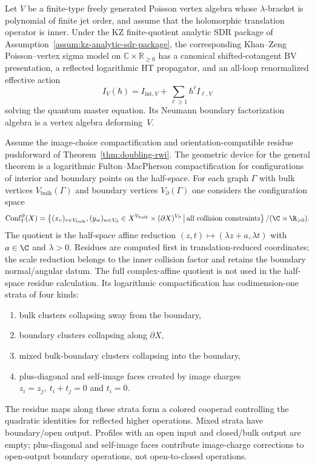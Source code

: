 \begin{theorem}\label{thm:general-half-space-bv-preview}
Let $V$ be a finite-type freely generated Poisson vertex algebra
whose $\lambda$-bracket is polynomial of finite jet order, and assume
that the holomorphic translation operator is inner. Under the KZ
finite-quotient analytic SDR package of
Assumption~\ref{assum:kz-analytic-sdr-package}, the corresponding
Khan--Zeng Poisson--vertex sigma model on
$\mathbb C\times\mathbb R_{\ge 0}$ has a canonical shifted-cotangent
BV presentation, a reflected logarithmic HT propagator, and an
all-loop renormalized effective action
\[
 I_V(\hbar)=I_{\mathrm{int},V}
 +\sum_{\ell\geq 1}\hbar^\ell I_{\ell,V}
\]
solving the quantum master equation. Its Neumann boundary
factorization algebra is a vertex algebra deforming~$V$.
\end{theorem}

\begin{construction}\label{cons:half-space-colored-operad}
Assume the image-choice compactification and orientation-compatible residue pushforward of
Theorem~\ref{thm:doubling-rwi}.
The geometric device for the general theorem is a logarithmic Fulton--MacPherson compactification
for configurations of interior and boundary points on the half-space.
For each graph $\Gamma$ with bulk vertices $V_{\mathrm{bulk}}(\Gamma)$ and boundary vertices
$V_{\partial}(\Gamma)$ one considers the configuration space
\[
\operatorname{Conf}^{\partial}_{\Gamma}(X)
=
\left\{
(x_v)_{v\in V_{\mathrm{bulk}}},(y_w)_{w\in V_{\partial}}
\in X^{V_{\mathrm{bulk}}}\times (\partial X)^{V_{\partial}}
\,\middle|\,
\text{all collision constraints}
\right\}/(\C\rtimes\R_{>0}).
\]
The quotient is the half-space affine reduction
\((z,t)\mapsto (\lambda z+a,\lambda t)\) with \(a\in\C\) and
\(\lambda>0\).  Residues are computed first in
translation-reduced coordinates; the scale reduction belongs to the
inner collision factor and retains the boundary normal/angular datum.
The full complex-affine quotient is not used in the half-space
residue calculation.
Its logarithmic compactification has codimension-one strata of four kinds:
\begin{enumerate}
 \item bulk clusters collapsing away from the boundary,
 \item boundary clusters collapsing along $\partial X$,
 \item mixed bulk-boundary clusters collapsing into the boundary,
 \item plus-diagonal and self-image faces created by image charges
 $z_i=z_j,\ t_i+t_j=0$ and $t_i=0$.
\end{enumerate}
The residue maps along these strata form a colored cooperad controlling the quadratic identities for reflected
higher operations.
Mixed strata have boundary/open output. Profiles with an open input and
closed/bulk output are empty; plus-diagonal and self-image faces
contribute image-charge corrections to open-output boundary operations,
not open-to-closed operations.
\end{construction}

